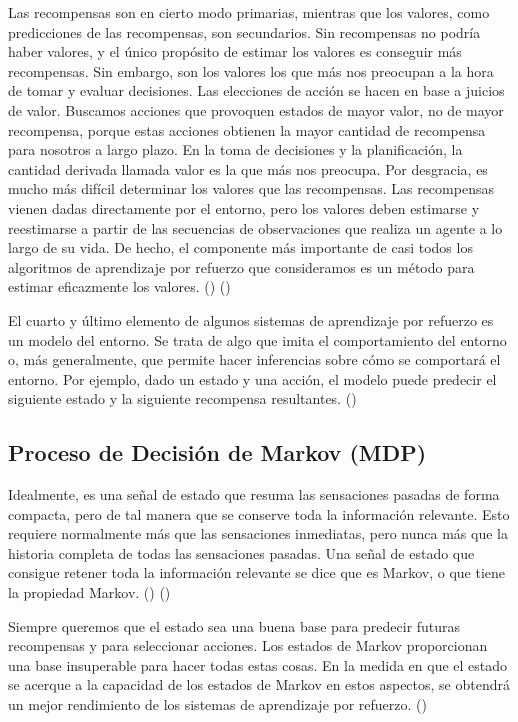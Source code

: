 Las recompensas son en cierto modo primarias, mientras que los valores, como predicciones de las recompensas, son secundarios. Sin recompensas no podría haber valores, y el único propósito de estimar los valores es conseguir más recompensas. Sin embargo, son los valores los que más nos preocupan a la hora de tomar y evaluar decisiones. Las elecciones de acción se hacen en base a juicios de valor. Buscamos acciones que provoquen estados de mayor valor, no de mayor recompensa, porque estas acciones obtienen la mayor cantidad de recompensa para nosotros a largo plazo. En la toma de decisiones y la planificación, la cantidad derivada llamada valor es la que más nos preocupa. Por desgracia, es mucho más difícil determinar los valores que las recompensas. Las recompensas vienen dadas directamente por el entorno, pero los valores deben estimarse y reestimarse a partir de las secuencias de observaciones que realiza un agente a lo largo de su vida. De hecho, el componente más importante de casi todos los algoritmos de aprendizaje por refuerzo que consideramos es un método para estimar eficazmente los valores. (\cite{sutton1998introduction}) (\cite{rao2000reinforcement})

El cuarto y último elemento de algunos sistemas de aprendizaje por refuerzo es un modelo del entorno. Se trata de algo que imita el comportamiento del entorno o, más generalmente, que permite hacer inferencias sobre cómo se comportará el entorno. Por ejemplo, dado un estado y una acción, el modelo puede predecir el siguiente estado y la siguiente recompensa resultantes. (\cite{sutton1998introduction})


\subsection{Proceso de Decisión de Markov (MDP)}

Idealmente, es una señal de estado que resuma las sensaciones pasadas de forma compacta, pero de tal manera que se conserve toda la información relevante. Esto requiere normalmente más que las sensaciones inmediatas, pero nunca más que la historia completa de todas las sensaciones pasadas. Una señal de estado que consigue retener toda la información relevante se dice que es Markov, o que tiene la propiedad Markov. (\cite{rao2000reinforcement}) (\cite{wiering2012reinforcement})

Siempre queremos que el estado sea una buena base para predecir futuras recompensas y para seleccionar acciones. Los estados de Markov proporcionan una base insuperable para hacer todas estas cosas. En la medida en que el estado se acerque a la capacidad de los estados de Markov en estos aspectos, se obtendrá un mejor rendimiento de los sistemas de aprendizaje por refuerzo. (\cite{wiering2012reinforcement})

